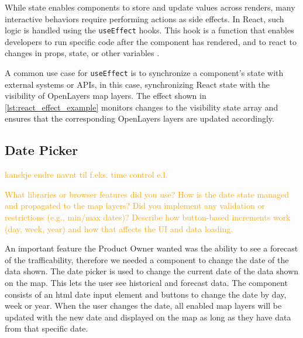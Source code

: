 \begin{figure}[h]

\end{figure}

While state enables components to store and update values across renders, many interactive behaviors require performing actions as side effects. In React, such logic is handled using the \texttt{useEffect} hooks. This hook is a function that enables developers to run specific code after the component has rendered, and to react to changes in props, state, or other variables \cite{react_useEffect}.

A common use case for \texttt{useEffect} is to synchronize a component's state with external systems or APIs, in this case, synchronizing React state with the visibility of OpenLayers map layers. The effect shown in \autoref{lst:react_effect_example} monitors changes to the visibility state array and ensures that the corresponding OpenLayers layers are updated accordingly.

\begin{figure}[h]

\end{figure}

\subsection{Date Picker}

\textcolor{orange}{kanskje endre navnt til f.eks. time control e.l.}

\textcolor{orange}{What libraries or browser features did you use?
How is the date state managed and propagated to the map layers?
Did you implement any validation or restrictions (e.g., min/max dates)?
Describe how button-based increments work (day, week, year) and how that affects the UI and data loading.}

An important feature the Product Owner wanted was the ability to see a forecast of the trafficability, therefore we needed a component to change the date of the data shown. The date picker is used to change the current date of the data shown on the map. This lets the user see historical and forecast data. The component consists of an \acrshort{html} date input element and buttons to change the date by day, week or year. When the user changes the date, all enabled map layers will be updated with the new date and displayed on the map as long as they have data from that specific date.

